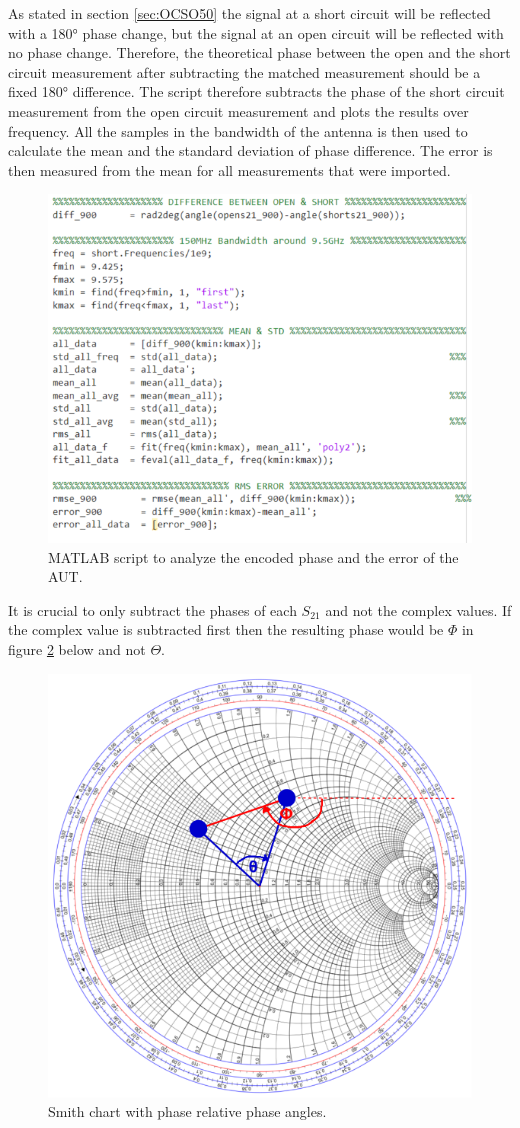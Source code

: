 As stated in section \ref{sec:OCSO50} the signal at a short circuit will be reflected with a 180° phase change, but the signal at an open circuit will be reflected with no phase change. Therefore, the theoretical phase between the open and the short circuit measurement after subtracting the matched measurement should be a fixed 180° difference. The script therefore subtracts the phase of the short circuit measurement from the open circuit measurement and plots the results over frequency. All the samples in the bandwidth of the antenna is then used to calculate the mean and the standard deviation of phase difference. The error is then measured from the mean for all measurements that were imported.

    \begin{figure}[H]
    \centering
    \includegraphics[width=0.6\linewidth]{Figures/chp3_code_diff_stats.png}
    \caption{MATLAB script to analyze the encoded phase and the error of the AUT.}
    \label{fig:chp3_code_diff_stats}
    \end{figure}

It is crucial to only subtract the phases of each \(S_{21}\) and not the complex values. If the complex value is subtracted first then the resulting phase would be \(\Phi\) in figure \ref{fig:chp3_smithchart_vector} below and not \(\Theta\).

    \begin{figure}[H]
    \centering
    \includegraphics[width=0.4\linewidth]{Figures/chp3_smithchart_vector.png}
    \caption{Smith chart with phase relative phase angles.}
    \label{fig:chp3_smithchart_vector}
    \end{figure}

\ifstandalone

\printnoidxglossary[type=\acronymtype,nonumberlist]
\fi
%
